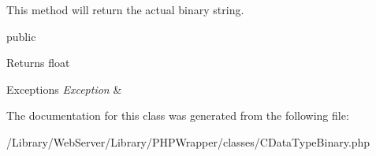 This method will return the actual binary string.

public \begin{DoxyReturn}{Returns}
float
\end{DoxyReturn}

\begin{DoxyExceptions}{Exceptions}
{\em Exception} & \\
\hline
\end{DoxyExceptions}


The documentation for this class was generated from the following file\-:\begin{DoxyCompactItemize}
\item 
/\-Library/\-Web\-Server/\-Library/\-P\-H\-P\-Wrapper/classes/C\-Data\-Type\-Binary.\-php\end{DoxyCompactItemize}
